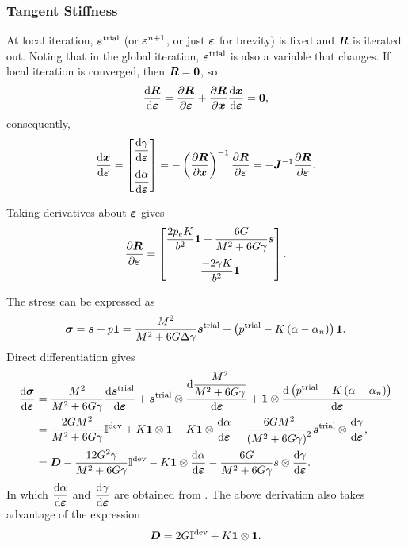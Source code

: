 \subsubsection{Tangent Stiffness}
At local iteration, $\bm{\varepsilon}^\text{trial}$ (or $\bm{\varepsilon}^{n+1}$, or just $\bm{\varepsilon}$ for brevity) is fixed and $\bm{R}$ is iterated out. Noting that in the global iteration, $\bm{\varepsilon}^\text{trial}$ is also a variable that changes. If local iteration is converged, then $\bm{R}=\bm{0}$, so
\begin{gather}
\dfrac{\mathrm{d}\bm{R}}{\mathrm{d}\bm{\varepsilon}}=\dfrac{\partial{\bm{R}}}{\partial{\bm{\varepsilon}}}+\dfrac{\partial{\bm{R}}}{\partial{\bm{x}}}\dfrac{\mathrm{d}\bm{x}}{\mathrm{d}\bm{\varepsilon}}=\bm{0},
\end{gather}
consequently,
\begin{gather}\label{eq:mcc_tangent}
\dfrac{\mathrm{d}\bm{x}}{\mathrm{d}\bm{\varepsilon}}=
\begin{bmatrix}
\dfrac{\mathrm{d}\gamma}{\mathrm{d}\bm{\varepsilon}}\\[4mm]\dfrac{\mathrm{d}\alpha}{\mathrm{d}\bm{\varepsilon}}
\end{bmatrix}
=-\left(\dfrac{\partial{\bm{R}}}{\partial{\bm{x}}}\right)^{-1}\dfrac{\partial{\bm{R}}}{\partial{\bm{\varepsilon}}}=-\bm{J}^{-1}\dfrac{\partial{\bm{R}}}{\partial{\bm{\varepsilon}}}.
\end{gather}

Taking derivatives about $\bm{\varepsilon}$ gives
\begin{gather}
\dfrac{\partial{\bm{R}}}{\partial{\bm{\varepsilon}}}=\begin{bmatrix}
\dfrac{2p_eK}{b^2}\bm{1}+\dfrac{6G}{M^2+6G\gamma}\bm{s}\\[4mm]
\dfrac{-2\gamma{}K}{b^2}\bm{1}
\end{bmatrix}.
\end{gather}

The stress can be expressed as
\begin{gather}
\bm{\sigma}=\bm{s}+p\bm{1}=\dfrac{M^2}{M^2+6G\Delta\gamma}\bm{s}^\text{trial}+\left(p^\text{trial}-K\left(\alpha-\alpha_n\right)\right)\bm{1}.
\end{gather}
Direct differentiation gives
\begin{gather}
\begin{split}
\dfrac{\mathrm{d}\bm{\sigma}}{\mathrm{d}\bm{\varepsilon}}&=\dfrac{M^2}{M^2+6G\gamma}\dfrac{\mathrm{d}\bm{s}^\text{trial}}{\mathrm{d}\bm{\varepsilon}}+\bm{s}^\text{trial}\otimes\dfrac{\mathrm{d}\dfrac{M^2}{M^2+6G\gamma}}{\mathrm{d}\bm{\varepsilon}}+\bm{1}\otimes\dfrac{\mathrm{d}\left(p^\text{trial}-K\left(\alpha-\alpha_n\right)\right)}{\mathrm{d}\bm{\varepsilon}}\\
&=\dfrac{2GM^2}{M^2+6G\gamma}\mathbb{I}^\text{dev}+K\bm{1}\otimes{}\bm{1}-K\bm{1}\otimes\dfrac{\mathrm{d}\alpha}{\mathrm{d}\bm{\varepsilon}}-\dfrac{6GM^2}{\left(M^2+6G\gamma\right)^2}\bm{s}^\text{trial}\otimes\dfrac{\mathrm{d}\gamma}{\mathrm{d}\bm{\varepsilon}},\\
&=\bm{D}-\dfrac{12G^2\gamma}{M^2+6G\gamma}\mathbb{I}^\text{dev}-K\bm{1}\otimes\dfrac{\mathrm{d}\alpha}{\mathrm{d}\bm{\varepsilon}}-\dfrac{6G}{M^2+6G\gamma}s\otimes\dfrac{\mathrm{d}\gamma}{\mathrm{d}\bm{\varepsilon}}.
\end{split}
\end{gather}
In which $\dfrac{\mathrm{d}\alpha}{\mathrm{d}\bm{\varepsilon}}$ and $\dfrac{\mathrm{d}\gamma}{\mathrm{d}\bm{\varepsilon}}$ are obtained from .
The above derivation also takes advantage of the expression
\begin{gather}
\bm{D}=2G\mathbb{I}^\text{dev}+K\bm{1}\otimes{}\bm{1}.
\end{gather}
